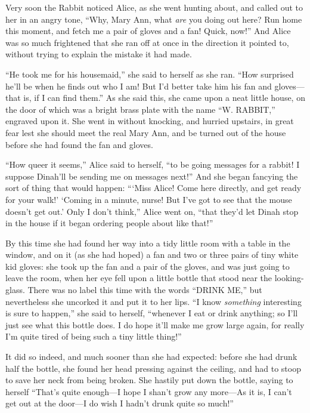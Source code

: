 \documentclass[11pt,openany,oneside]{book}
\begin{document}
Very soon the Rabbit noticed Alice, as she went hunting about, and called out to her in an angry tone, “Why, Mary Ann, what {\em are\/} you doing out here? Run home this moment, and fetch me a pair of gloves and a fan! Quick, now!” And Alice was so much frightened that she ran off at once in the direction it pointed to, without trying to explain the mistake it had made. 

“He took me for his housemaid,” she said to herself as she ran. “How surprised he’ll be when he finds out who I am! But I’d better take him his fan and gloves—that is, if I can find them.” As she said this, she came upon a neat little house, on the door of which was a bright brass plate with the name “W. RABBIT,” engraved upon it. She went in without knocking, and hurried upstairs, in great fear lest she should meet the real Mary Ann, and be turned out of the house before she had found the fan and gloves. 

“How queer it seems,” Alice said to herself, “to be going messages for a rabbit! I suppose Dinah’ll be sending me on messages next!” And she began fancying the sort of thing that would happen: “‘Miss Alice! Come here directly, and get ready for your walk!’ ‘Coming in a minute, nurse! But I’ve got to see that the mouse doesn’t get out.’ Only I don’t think,” Alice went on, “that they’d let Dinah stop in the house if it began ordering people about like that!” 

By this time she had found her way into a tidy little room with a table in the window, and on it (as she had hoped) a fan and two or three pairs of tiny white kid gloves: she took up the fan and a pair of the gloves, and was just going to leave the room, when her eye fell upon a little bottle that stood near the looking-glass. There was no label this time with the words “DRINK ME,” but nevertheless she uncorked it and put it to her lips. “I know {\em something\/} interesting is sure to happen,” she said to herself, “whenever I eat or drink anything; so I’ll just see what this bottle does. I do hope it’ll make me grow large again, for really I’m quite tired of being such a tiny little thing!” 

It did so indeed, and much sooner than she had expected: before she had drunk half the bottle, she found her head pressing against the ceiling, and had to stoop to save her neck from being broken. She hastily put down the bottle, saying to herself “That’s quite enough—I hope I shan’t grow any more—As it is, I can’t get out at the door—I do wish I hadn’t drunk quite so much!” 
\end{document}
